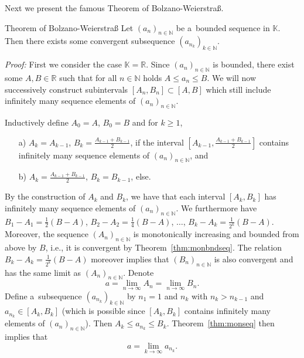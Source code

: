 Next we present the famous Theorem of Bolzano-Weierstra\ss. 
\begin{Theorem}{Theorem of Bolzano-Weierstra\ss}\label{thm:bzr}
Let $(a_n)_{n\in\mathbb{N}}$ be a~bounded sequence in $\mathbb{K}$. Then there exists some convergent subsequence $(a_{n_k})_{k\in\mathbb{N}}$.
\end{Theorem}
{\em Proof:} First we consider the case $\mathbb{K}=\mathbb{R}$. 
Since $(a_n)_{n\in\mathbb{N}}$ is bounded, there exist some $A,B\in\mathbb{R}$ such that for all $n\in\mathbb{N}$ holds $A\leq a_n\leq B$. 
We will now successively construct subintervals $[A_n,B_n]\subset[A,B]$ which still include infinitely many sequence elements of $(a_n)_{n\in\mathbb{N}}$.

Inductively define $A_0=A$, $B_0=B$ and for $k\geq1$,
\begin{itemize}
 \item[a)] $A_k=A_{k-1}$, $B_k=\frac{A_{k-1}+B_{k-1}}2$, if the interval $[A_{k-1},\frac{A_{k-1}+B_{k-1}}2]$ contains
           infinitely many sequence elements of $(a_n)_{n\in\mathbb{N}}$, and
 \item[b)] $A_k=\frac{A_{k-1}+B_{k-1}}2$, $B_k=B_{k-1}$, else.
\end{itemize}
By the construction of $A_k$ and $B_k$, we have that each interval $[A_k,B_k]$ has infinitely many sequence elements of $(a_n)_{n\in\mathbb{N}}$. 
We furthermore have $B_1-A_1=\frac12(B-A)$, $B_2-A_2=\frac14(B-A)$, $\ldots$, $B_k-A_k=\frac1{2^k}(B-A)$. 
Moreover, the sequence $(A_n)_{n\in\mathbb{N}}$ is monotonically increasing and bounded from above by $B$, i.e., it is convergent by
Theorem~\ref{thm:monbndseq}. The relation $B_k-A_k=\frac1{2^k}(B-A)$ moreover implies that $(B_n)_{n\in\mathbb{N}}$ is also convergent and has 
the same limit as $(A_n)_{n\in\mathbb{N}}$. Denote
\[a=\lim_{n\to\infty}A_{n}=\lim_{n\to\infty}B_{n}.\]
Define a~subsequence $(a_{n_k})_{k\in\mathbb{N}}$ by $n_1=1$ and $n_k$ with $n_k>n_{k-1}$ and $a_{n_k}\in[A_k,B_k]$ 
(which is possible since $[A_k,B_k]$ contains infinitely many elements of $(a_{n})_{n\in\mathbb{N}}$).
Then $A_k\leq a_{n_k}\leq B_k$. Theorem~\ref{thm:monseq} then implies that
\[a=\lim_{k\to\infty}a_{n_k}.\]

